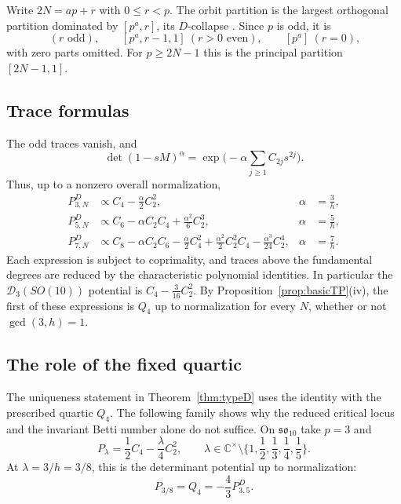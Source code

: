 \documentclass[10pt,reqno]{amsart}
\numberwithin{equation}{section}
\theoremstyle{plain}
\theoremstyle{definition}
\begin{document}
Write $2N=ap+r$ with $0\le r<p$. The orbit partition is the largest orthogonal partition dominated by $[p^a,r]$, its $D$-collapse \cite{CM}. Since $p$ is odd, it is
\begin{equation*}
	[p^a,r]\ (r\text{ odd}),\qquad [p^a,r-1,1]\ (r>0\text{ even}),\qquad [p^a]\ (r=0),
\end{equation*}
with zero parts omitted. For $p\ge2N-1$ this is the principal partition $[2N-1,1]$.

\subsection{Trace formulas}

The odd traces vanish, and
\begin{equation*}
	\det(1-sM)^\alpha=\exp\Big(-\alpha\sum_{j\ge1}C_{2j}s^{2j}\Big).
\end{equation*}
Thus, up to a nonzero overall normalization,
\begin{align*}
	P^D_{3,N}&\propto C_4-\frac\alpha2C_2^2, & \alpha&=\frac3h,\\
	P^D_{5,N}&\propto C_6-\alpha C_2C_4+\frac{\alpha^2}6C_2^3, & \alpha&=\frac5h,\\
	P^D_{7,N}&\propto C_8-\alpha C_2C_6-\frac\alpha2C_4^2+\frac{\alpha^2}2C_2^2C_4-\frac{\alpha^3}{24}C_2^4, & \alpha&=\frac7h.
\end{align*}
Each expression is subject to coprimality, and traces above the fundamental degrees are reduced by the characteristic polynomial identities. In particular the $\mathcal{D}_3(SO(10))$ potential is $C_4-\frac3{16}C_2^2$. By Proposition~\ref{prop:basicTP}(iv), the first of these expressions is $Q_4$ up to normalization for every $N$, whether or not $\gcd(3,h)=1$.

\subsection{The role of the fixed quartic}\label{sec:quartic}

The uniqueness statement in Theorem~\ref{thm:typeD} uses the identity with the prescribed quartic $Q_4$. The following family shows why the reduced critical locus and the invariant Betti number alone do not suffice. On $\mathfrak{so}_{10}$ take $p=3$ and
\begin{equation}\label{eq:Plambda}
	P_\lambda=\frac12C_4-\frac\lambda4C_2^2,\qquad
	\lambda\in\mathbb{C}^\times\setminus\Big\{1,\frac12,\frac13,\frac14,\frac15\Big\}.
\end{equation}
At $\lambda=3/h=3/8$, this is the determinant potential up to normalization:
\begin{equation*}
	P_{3/8}=Q_4=-\frac43P^D_{3,5}.
\end{equation*}
\end{document}

